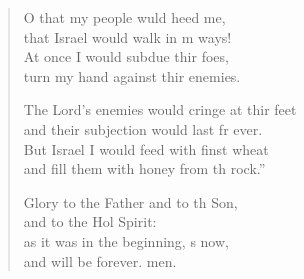 \begin{verse}
\begin{patverse}
O that my people wuld heed me,\Med\\
that Israel would walk in m ways!\\
At once I would subdue thir foes,\Med\\
turn my hand against thir enemies.

The Lord’s enemies would cringe at thir feet\Med\\
and their subjection would last fr ever.\\
But Israel I would feed with finst wheat\Med\\
and fill them with honey from th rock.”

Glory to the Father and to th Son,\Med\\
and to the Hol Spirit:\\
as it was in the beginning, s now,\Med\\
and will be forever. men. 
  \end{patverse}
\end{verse}
